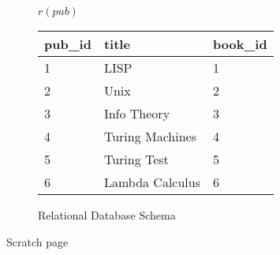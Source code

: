 \documentclass[answers,10pt,a4paper]{exam}
\begin{document}
\begin{figure}[H]
\begin{multicols}{2}
\columnbreak

$r(pub)$\\
\begin{tabular}{|l|l|l|}\hline
\rowcolor{lightgray} pub\_id & title           & book\_id \\\hline
     1 & LISP            &       1 \\\hline
     2 & Unix            &       2 \\\hline
     3 & Info Theory     &       3 \\\hline
     4 & Turing Machines &       4 \\\hline
     5 & Turing Test     &       5 \\\hline
     6 & Lambda Calculus &       6 \\\hline
\end{tabular}

\end{multicols}



\caption{Relational Database Schema}
\label{fig:db-schema}
\end{figure}

\newpage

Scratch page

\newpage
\end{document}
